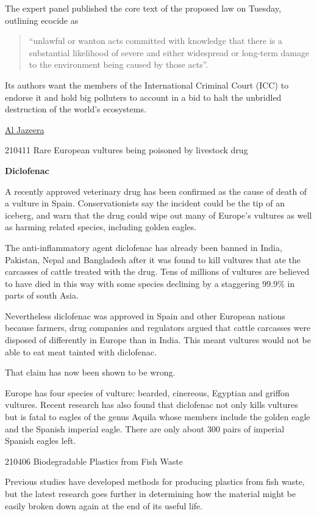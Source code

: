 \documentclass[
]{book}
\begin{document}
The expert panel published the core text of the proposed law on Tuesday, outlining ecocide as

\begin{quote}
``unlawful or wanton acts committed with knowledge that there is a substantial likelihood of severe and either widespread or long-term damage to the environment being caused by those acts''.
\end{quote}

Its authors want the members of the International Criminal Court (ICC) to endorse it and hold big polluters to account in a bid to halt the unbridled destruction of the world's ecosystems.

\href{https://www.aljazeera.com/news/2021/6/22/legal-experts-unveil-new-definition-ecocide}{Al Jazeera}

210411 Rare European vultures being poisoned by livestock drug

\textbf{Diclofenac}

A recently approved veterinary drug has been confirmed as the cause of death of a vulture in Spain. Conservationists say the incident could be the tip of an iceberg, and warn that the drug could wipe out many of Europe's vultures as well as harming related species, including golden eagles.

The anti-inflammatory agent diclofenac has already been banned in India, Pakistan, Nepal and Bangladesh after it was found to kill vultures that ate the carcasses of cattle treated with the drug. Tens of millions of vultures are believed to have died in this way with some species declining by a staggering 99.9\% in parts of south Asia.

Nevertheless diclofenac was approved in Spain and other European nations because farmers, drug companies and regulators argued that cattle carcasses were disposed of differently in Europe than in India. This meant vultures would not be able to eat meat tainted with diclofenac.

That claim has now been shown to be wrong.

Europe has four species of vulture: bearded, cinereous, Egyptian and griffon vultures. Recent research has also found that diclofenac not only kills vultures but is fatal to eagles of the genus Aquila whose members include the golden eagle and the Spanish imperial eagle. There are only about 300 pairs of imperial Spanish eagles left.

210406 Biodegradable Plastics from Fish Waste

Previous studies have developed methods for producing plastics from fish waste, but the latest research goes further in determining how the material might be easily broken down again at the end of its useful life.
\end{document}
